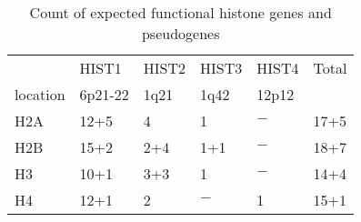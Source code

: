 \begin{table}
  \centering
  \begin{tabular}{l | l | l | l | l | l }
    \null & HIST1 & HIST2 & HIST3 & HIST4 & Total \\
    location & 6p21-22 & 1q21 & 1q42 & 12p12 & \null \\
    \hline
    H2A   & 12+5      & 4         & 1         & $-$       & 17+5  \\
    H2B   & 15+2      & 2+4       & 1+1       & $-$       & 18+7  \\
    H3    & 10+1      & 3+3       & 1         & $-$       & 14+4  \\
    H4    & 12+1      & 2         & $-$       & 1         & 15+1  \\
  \end{tabular}
  \caption{Count of expected functional histone genes and pseudogenes}
  \label{tab:histone}
\end{table}
